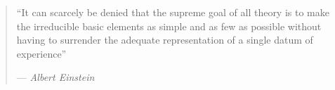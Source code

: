 %
\cleardoublepage
\thispagestyle{empty}

\begin{quote}
\noindent``It can scarcely be denied that the supreme goal of all theory is to make the irreducible basic elements as simple and as few as possible without having to surrender the adequate representation of a single datum of experience'' 

--- \emph{Albert Einstein}
\end{quote}


\clearemptydoublepage